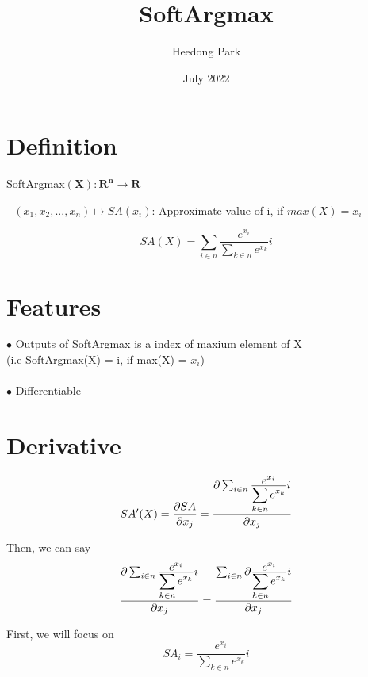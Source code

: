 \documentclass{article}
\title{SoftArgmax}
\author{Heedong Park}
\date{July 2022}
\begin{document}
\maketitle

\section{Definition}

SoftArgmax$(\mathbf{X}) : \mathbf{R^n} \longrightarrow \mathbf{R}$ 

\quad \,\, $({x_1},{x_2},...,{x_n}) \longmapsto SA(x_i)$: Approximate value of i, if $max(X) = x_i$


\begin{equation} 
SA(X)=\sum_{i \in n} {\frac {\displaystyle e^{x_i}} 
{\displaystyle \sum_{k \in n} e^{x_k}}} i 
\end{equation}

\section{Features}
$\bullet$ Outputs of SoftArgmax is a index of maxium element of X\\(i.e SoftArgmax(X) = i, if max(X) = $x_i$)\\\\
$\bullet$ Differentiable




\section{Derivative}
\begin{equation}
SA^\prime(X)={\partial SA\over \partial x_j}={\partial \sum_{i \in n} {\frac {\displaystyle e^{x_i}}
{\displaystyle \sum_{k \in n} e^{x_k}}} i \over \partial x_j}    
\end{equation}

Then, we can say \begin{equation}
{\partial \sum_{i \in n} {\frac {\displaystyle e^{x_i}}
{\displaystyle \sum_{k \in n} e^{x_k}}} i \over \partial x_j} =
{\sum_{i \in n} \partial {\frac {\displaystyle e^{x_i}} {\displaystyle \sum_{k \in n} e^{x_k}}} i \over \partial x_j}
\end{equation}

First, we will focus on \begin{equation}
SA_i = {{\frac {\displaystyle e^{x_i}} {\displaystyle \sum_{k \in n} e^{x_k}}} i}
\end{equation}
\end{document}
